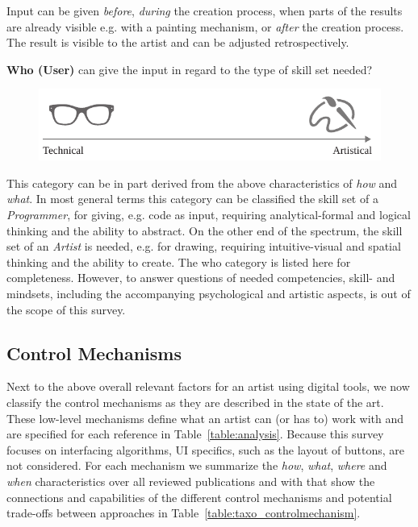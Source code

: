 Input can be given \textit{before}, \textit{during} the creation process, when parts of the results are already visible e.g. with a painting mechanism, or \textit{after} the creation process. The result is visible to the artist and can be adjusted retrospectively.


\noindent\textbf{Who (User)} can give the input in regard to the type of skill set needed? 
\begin{figure}[H]
    \centering
        \includegraphics[width=\controlParamsFigWidth\linewidth]{figures/control_paradigms/who.pdf}
\end{figure}

This category can be in part derived from the above characteristics of \textit{how} and \textit{what}. In most general terms this category can be classified the skill set of a \textit{Programmer}, for giving, e.g. code as input, requiring analytical-formal and logical thinking and the ability to abstract. On the other end of the spectrum, the skill set of an \textit{Artist} is needed, e.g. for drawing, requiring intuitive-visual and spatial thinking and the ability to create.
The who category is listed here for completeness. However, to answer questions of needed competencies, skill- and mindsets, including the accompanying psychological and artistic aspects, is out of the scope of this survey.


\subsection{Control Mechanisms}\label{subsec:taxo_control_mechanism}
Next to the above overall relevant factors for an artist using digital tools, we now classify the control mechanisms as they are described in the state of the art. These low-level mechanisms define what an artist can (or has to) work with and are specified for each reference in Table~\ref{table:analysis}. Because this survey focuses on interfacing algorithms, UI specifics, such as the layout of buttons, are not considered. For each mechanism we summarize the \textit{how}, \textit{what}, \textit{where} and \textit{when} characteristics over all reviewed publications and with that show the connections and capabilities of the different control mechanisms and potential trade-offs between approaches in Table~\ref{table:taxo_controlmechanism}.


